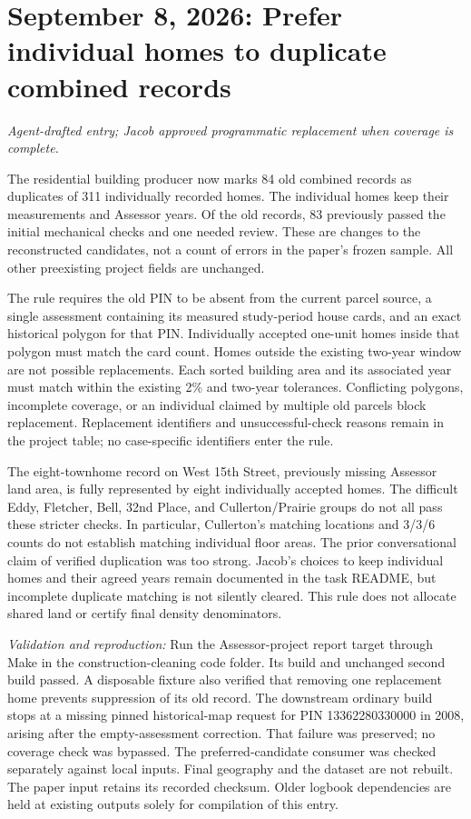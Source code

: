 \section*{September 8, 2026: Prefer individual homes to duplicate combined records}
\textit{Agent-drafted entry; Jacob approved programmatic replacement when coverage is complete.}

The residential building producer now marks 84 old combined records as duplicates
of 311 individually recorded homes. The individual homes keep their measurements
and Assessor years. Of the old records, 83 previously passed the initial mechanical
checks and one needed review. These are changes to the reconstructed candidates,
not a count of errors in the paper's frozen sample. All other preexisting project
fields are unchanged.

The rule requires the old PIN to be absent from the current parcel source, a
single assessment containing its measured study-period house cards, and an exact
historical polygon for that PIN. Individually accepted one-unit homes inside that
polygon must match the card count. Homes outside the existing two-year window are
not possible replacements. Each sorted building area and its associated year
must match within the existing 2\% and two-year tolerances. Conflicting polygons,
incomplete coverage, or an individual claimed by multiple old parcels block
replacement. Replacement identifiers and unsuccessful-check reasons remain in
the project table; no case-specific identifiers enter the rule.

The eight-townhome record on West 15th Street, previously missing Assessor land
area, is fully represented by eight individually accepted homes. The difficult
Eddy, Fletcher, Bell, 32nd Place, and Cullerton/Prairie groups do not all pass
these stricter checks. In particular, Cullerton's matching locations and 3/3/6
counts do not establish matching individual floor areas. The prior conversational
claim of verified duplication was too strong. Jacob's choices to keep individual
homes and their agreed years remain documented in the task README, but incomplete
duplicate matching is not silently cleared. This rule does not allocate shared
land or certify final density denominators.

\textit{Validation and reproduction:} Run the Assessor-project report target
through Make in the construction-cleaning code folder. Its build and unchanged
second build passed. A disposable fixture also verified that removing one
replacement home prevents suppression of its old record. The downstream ordinary
build stops at a missing pinned historical-map request for PIN 13362280330000 in
2008, arising after the empty-assessment correction. That failure was preserved;
no coverage check was bypassed. The preferred-candidate consumer was checked
separately against local inputs. Final geography and the dataset are not rebuilt.
The paper input retains its recorded checksum. Older logbook dependencies are
held at existing outputs solely for compilation of this entry.
